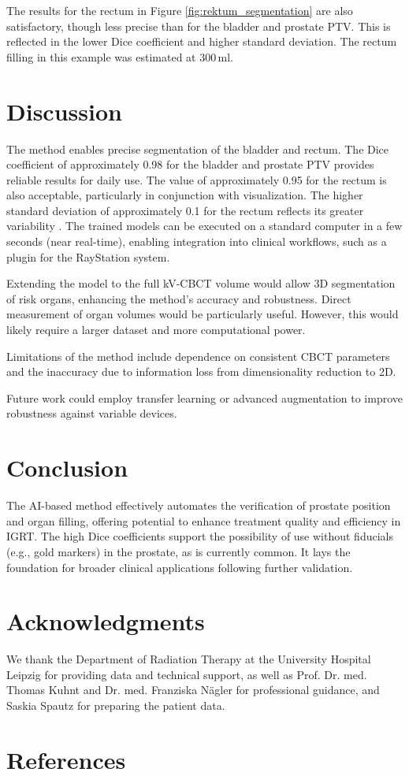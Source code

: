 \documentclass{article}
\begin{document}
The results for the rectum in Figure \ref{fig:rektum_segmentation} are also
satisfactory, though less precise than for the bladder and prostate PTV. This is
reflected in the lower Dice coefficient and higher standard deviation. The
rectum filling in this example was estimated at 300\,ml.

\section{Discussion}
The method enables precise segmentation of the bladder and rectum. The Dice
coefficient of approximately 0.98 for the bladder and prostate PTV provides
reliable results for daily use. The value of approximately 0.95 for the rectum
is also acceptable, particularly in conjunction with visualization. The higher
standard deviation of approximately 0.1 for the rectum reflects its greater
variability \citep{litjens2017}. The trained models can be executed on a
standard computer in a few seconds (near real-time), enabling integration into
clinical workflows, such as a plugin for the RayStation system.

Extending the model to the full kV-CBCT volume would allow 3D segmentation of
risk organs, enhancing the method’s accuracy and robustness. Direct measurement
of organ volumes would be particularly useful. However, this would likely
require a larger dataset and more computational power.

Limitations of the method include dependence on consistent CBCT parameters and
the inaccuracy due to information loss from dimensionality reduction to 2D.

Future work could employ transfer learning or advanced augmentation to improve
robustness against variable devices.

\section{Conclusion}
The AI-based method effectively automates the verification of prostate position
and organ filling, offering potential to enhance treatment quality and
efficiency in IGRT. The high Dice coefficients support the possibility of use
without fiducials (e.g., gold markers) in the prostate, as is currently common.
It lays the foundation for broader clinical applications following further
validation.

\section{Acknowledgments}
We thank the Department of Radiation Therapy at the University Hospital Leipzig
for providing data and technical support, as well as Prof. Dr. med. Thomas Kuhnt
and Dr. med. Franziska Nägler for professional guidance, and Saskia Spautz for
preparing the patient data.

\section{References}


\end{document}
